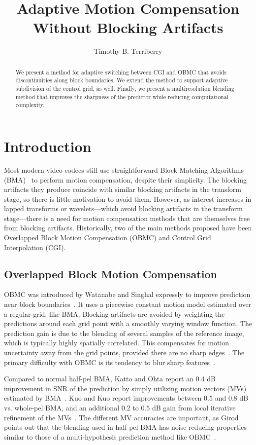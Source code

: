 \documentclass[11pt,letterpaper]{article}
\title{Adaptive Motion Compensation Without Blocking Artifacts}
\author{Timothy B. Terriberry}
\date{}
\begin{document}
\maketitle

\begin{abstract}
We present a method for adaptive switching between CGI and OBMC that avoids
 discontinuities along block boundaries.
We extend the method to support adaptive subdivision of the control grid, as
 well.
Finally, we present a multiresolution blending method that improves the
 sharpness of the predictor while reducing computational complexity.
\end{abstract}

\section{Introduction}

Most modern video codecs still use straightforward Block Matching Algorithms
 (BMA)~\cite{DM95} to perform motion compensation, despite their simplicity. 
The blocking artifacts they produce coincide with similar blocking artifacts in
 the transform stage, so there is little motivation to avoid them.
However, as interest increases in lapped transforms or wavelets---which avoid
 blocking artifacts in the transform stage---there is a need for motion
 compensation methods that are themselves free from blocking artifacts.
Historically, two of the main methods proposed have been Overlapped Block
 Motion Compensation (OBMC) and Control Grid Interpolation (CGI).

\subsection{Overlapped Block Motion Compensation}

OBMC was introduced by Watanabe and Singhal expressly to improve prediction
 near block boundaries~\cite{WS91}.
It uses a piecewise constant motion model estimated over a regular grid, like
 BMA.
Blocking artifacts are avoided by weighting the predictions around each grid
 point with a smoothly varying window function.
The prediction gain is due to the blending of several samples of the reference
 image, which is typically highly spatially correlated.
This compensates for motion uncertainty away from the grid points, provided
 there are no sharp edges~\cite{OS94,ZSNKI02}.
The primary difficulty with OBMC is its tendency to blur sharp
 features~\cite{Ish98}.

Compared to normal half-pel BMA, Katto and Ohta report an $0.4$ dB
 improvement in SNR of the prediction by simply utilizing motion vectors (MVs)
 estimated by BMA~\cite{KO95}.
Kuo and Kuo report improvements between $0.5$ and $0.8$ dB vs. whole-pel BMA,
 and an additional $0.2$ to $0.5$ dB gain from local iterative refinement of
 the MVs~\cite{KK97}.
The different MV accuracies are important, as Girod points out that the
 blending used in half-pel BMA has noise-reducing properties similar to those
 of a multi-hypothesis prediction method like OBMC~\cite{Gir00}.
\end{document}
